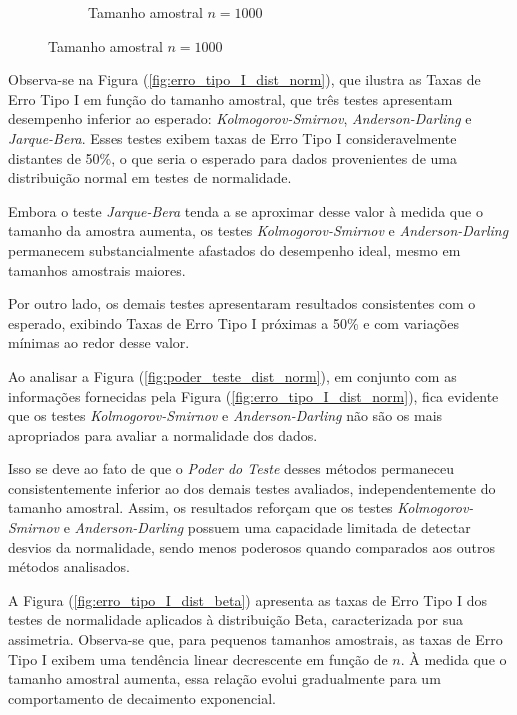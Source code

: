 \documentclass[a4paper,11pt]{article} %
\begin{document}
\begin{figure}[H]
\begin{subfigure}[b]{0.45\textwidth}
        \caption{Tamanho amostral \(n = 1000\)}
        \label{fig:cauchy_poder_1000}
    \end{subfigure}
\end{figure}

Observa-se na Figura (\ref{fig:erro_tipo_I_dist_norm}), que ilustra as Taxas de Erro Tipo I em função do tamanho amostral, que três testes apresentam desempenho inferior ao esperado: \textit{Kolmogorov-Smirnov}, \textit{Anderson-Darling} e \textit{Jarque-Bera}. Esses testes exibem taxas de Erro Tipo I consideravelmente distantes de 50\%, o que seria o esperado para dados provenientes de uma distribuição normal em testes de normalidade.

Embora o teste \textit{Jarque-Bera} tenda a se aproximar desse valor à medida que o tamanho da amostra aumenta, os testes \textit{Kolmogorov-Smirnov} e \textit{Anderson-Darling} permanecem substancialmente afastados do desempenho ideal, mesmo em tamanhos amostrais maiores.

Por outro lado, os demais testes apresentaram resultados consistentes com o esperado, exibindo Taxas de Erro Tipo I próximas a 50\% e com variações mínimas ao redor desse valor.

\vspace{0.5cm}

Ao analisar a Figura (\ref{fig:poder_teste_dist_norm}), em conjunto com as informações fornecidas pela Figura (\ref{fig:erro_tipo_I_dist_norm}), fica evidente que os testes \textit{Kolmogorov-Smirnov} e \textit{Anderson-Darling} não são os mais apropriados para avaliar a normalidade dos dados.

Isso se deve ao fato de que o \textit{Poder do Teste} desses métodos permaneceu consistentemente inferior ao dos demais testes avaliados, independentemente do tamanho amostral. Assim, os resultados reforçam que os testes \textit{Kolmogorov-Smirnov} e \textit{Anderson-Darling} possuem uma capacidade limitada de detectar desvios da normalidade, sendo menos poderosos quando comparados aos outros métodos analisados.

\vspace{0.5cm}

A Figura (\ref{fig:erro_tipo_I_dist_beta}) apresenta as taxas de Erro Tipo I dos testes de normalidade aplicados à distribuição Beta, caracterizada por sua assimetria. Observa-se que, para pequenos tamanhos amostrais, as taxas de Erro Tipo I exibem uma tendência linear decrescente em função de $n$. À medida que o tamanho amostral aumenta, essa relação evolui gradualmente para um comportamento de decaimento exponencial.
\end{document}
